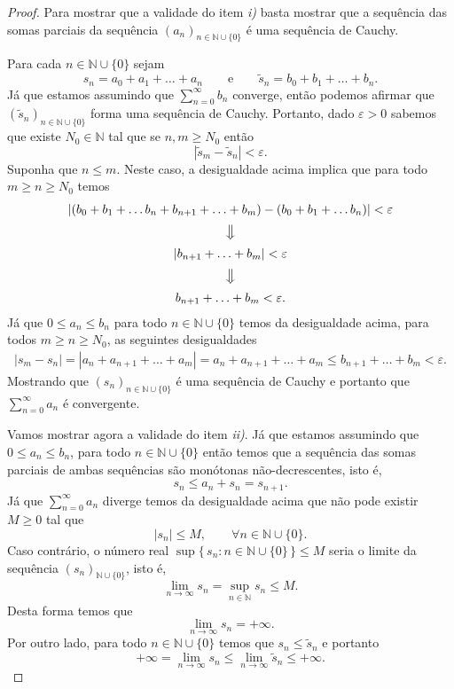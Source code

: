 \begin{proof}
Para mostrar que a validade do item \textit{i)} basta mostrar que a sequência 
das somas parciais da sequência $(a_n)_{n\in\mathbb{N}\cup\{0\}}$ é
uma sequência de Cauchy. 

Para cada $n\in\mathbb{N}\cup\{0\}$ sejam 
\[
s_n = a_0+a_1+\ldots+a_n 
\qquad\text{e}\qquad 
\widetilde{s}_n = b_0+b_1+\ldots+b_n.
\] 
Já que estamos assumindo que $\sum_{n=0}^{\infty} b_n$ converge, 
então podemos afirmar que 
$(\widetilde{s}_n)_{n\in\mathbb{N}\cup\{0\}}$ forma uma sequência de Cauchy. 
Portanto, dado $\varepsilon>0$ sabemos que existe $N_0\in\mathbb{N}$ tal que 
se $n,m\geqslant N_0$ então 
\[
|\widetilde{s}_m - \widetilde{s}_n|<\varepsilon.
\]
Suponha que $n\leqslant m$. Neste caso, a desigualdade acima implica que 
para todo $m\geqslant n \geqslant N_0$ temos
\[
\begin{array}{c}
|(b_0+b_1+\ldots b_n+b_{n+1}+\ldots +b_{m}) -(b_0+b_1+\ldots b_n) |<\varepsilon
\\[0.2cm]
\big\Downarrow
\\[0.2cm]
|b_{n+1}+\ldots +b_{m}|<\varepsilon
\\[0.2cm]
\big\Downarrow
\\[0.2cm]
b_{n+1}+\ldots +b_{m}<\varepsilon.
\end{array}
\]
Já que $0\leqslant a_n\leqslant b_n$ para todo $n\in\mathbb{N}\cup\{0\}$ 
temos da desigualdade acima, para todos $m\geqslant n \geqslant N_0$, as seguintes
desigualdades
\begin{align*}
|s_m-s_n| = |a_n+a_{n+1}+\ldots+a_{m}| = a_n+a_{n+1}+\ldots+a_{m}
\leqslant b_{n+1}+\ldots +b_{m}<\varepsilon.
\end{align*}
Mostrando que $(s_n)_{n\in\mathbb{N}\cup\{0\}}$
é uma sequência de Cauchy e portanto que $\sum_{n=0}^{\infty}a_n$ é convergente.

\medskip 
Vamos mostrar agora a validade do item \textit{ii)}. Já que 
estamos assumindo que $0\leqslant a_n\leqslant b_n$, para todo 
$n\in\mathbb{N}\cup\{0\}$ então temos que a sequência das somas parciais 
de ambas sequências são monótonas não-decrescentes, isto é,
\[
s_n\leqslant a_n+s_n  = s_{n+1}.
\]
Já que $\sum_{n=0}^{\infty} a_n$ diverge temos da desigualdade acima que não 
pode existir $M\geqslant 0$ tal que 
\[
|s_n|\leq M,\qquad \forall n\in\mathbb{N}\cup\{0\}.
\]
Caso contrário, o número real $\sup\{\, s_n: n\in\mathbb{N}\cup\{0\}\, \}\leqslant M$ 
seria o limite da sequência $(s_n)_{\mathbb{N}\cup\{0\}}$, isto é, 
\[ 
\lim_{n\to\infty} s_n = \sup_{n\in\mathbb{N}} s_n\leqslant M.
\]
Desta forma temos que 
\[
\lim_{n\to \infty} s_n = +\infty.
\]
Por outro lado, para todo $n\in\mathbb{N}\cup\{0\}$ temos que $s_n\leqslant \widetilde{s}_n$
e portanto 
\[
+\infty = \lim_{n\to\infty} s_n\leqslant \lim_{n\to\infty} \widetilde{s}_n 
\leqslant +\infty.
\]
\end{proof}


